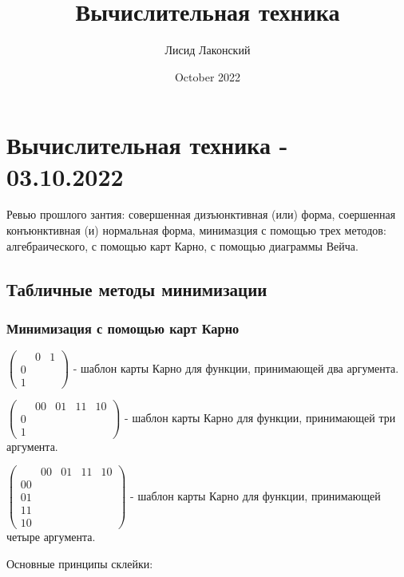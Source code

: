 \documentclass{article}
\title{Вычислительная техника}
\author{Лисид Лаконский}
\date{October 2022}
\begin{document}
\maketitle
\tableofcontents
\pagebreak

\section{Вычислительная техника - 03.10.2022}

Ревью прошлого зантия: совершенная дизъюнктивная (или) форма, соершенная конъюнктивная (и) нормальная форма, минимазция с помощью трех методов: алгебраического, с помощью карт Карно, с помощью диаграммы Вейча.

\subsection{Табличные методы минимизации}

\subsubsection{Минимизация с помощью карт Карно}

$
\begin{pmatrix}
     & 0 & 1 \\
    0 \\
    1
\end{pmatrix}
$ - шаблон карты Карно для функции, принимающей два аргумента.

$
\begin{pmatrix}
     & 00 & 01 & 11 & 10 \\
    0 \\
    1
\end{pmatrix}
$ - шаблон карты Карно для функции, принимающей три аргумента.

$
\begin{pmatrix}
     & 00 & 01 & 11 & 10 \\
    00 \\
    01 \\
    11 \\
    10
\end{pmatrix}
$ - шаблон карты Карно для функции, принимающей четыре аргумента.

Основные принципы склейки:
\end{document}
